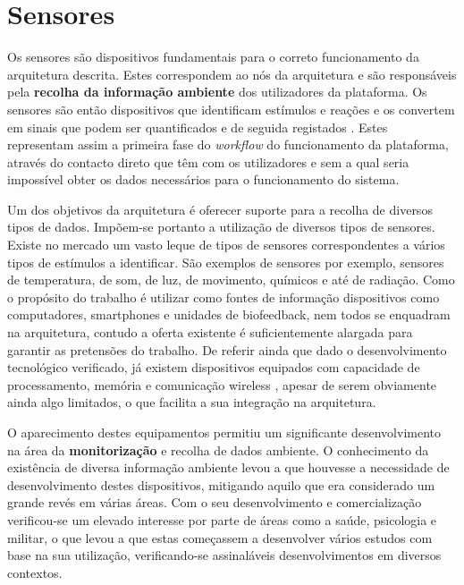 \section{Sensores}

Os sensores são dispositivos fundamentais para o correto funcionamento da arquitetura descrita. Estes correspondem ao nós da arquitetura e são responsáveis pela \textbf{recolha da informação ambiente} dos utilizadores da plataforma. Os sensores são então dispositivos que identificam estímulos e reações e os convertem em sinais que podem ser quantificados e de seguida registados \cite{akyildiz2002wireless}. Estes representam assim a primeira fase do \textit{workflow} do funcionamento da plataforma, através do contacto direto que têm com os utilizadores e sem a qual seria impossível obter os dados necessários para o funcionamento do sistema.

Um dos objetivos da arquitetura é oferecer suporte para a recolha de diversos tipos de dados. Impõem-se portanto a utilização de diversos tipos de sensores. Existe no mercado um vasto leque de tipos de sensores correspondentes a vários tipos de estímulos a identificar. São exemplos de sensores por exemplo, sensores de temperatura, de som, de luz, de movimento, químicos e até de radiação. Como o propósito do trabalho é utilizar como fontes de informação dispositivos como computadores, smartphones e unidades de biofeedback, nem todos se enquadram na arquitetura, contudo a oferta existente é suficientemente alargada para garantir as pretensões do trabalho. De referir ainda que dado o desenvolvimento tecnológico verificado, já existem dispositivos equipados com capacidade de processamento, memória e comunicação wireless \cite{akyildiz2002wireless}, apesar de serem obviamente ainda algo limitados, o que facilita a sua integração na arquitetura.

O aparecimento destes equipamentos permitiu um significante desenvolvimento na área da \textbf{monitorização} e recolha de dados ambiente\cite{himakashi2012wireless}. O conhecimento da existência de diversa informação ambiente levou a que houvesse a necessidade de desenvolvimento destes dispositivos, mitigando aquilo que era considerado um grande revés em várias áreas. Com o seu desenvolvimento e comercialização verificou-se um elevado interesse por parte de áreas como a saúde, psicologia e militar, o que levou a que estas começassem a desenvolver vários estudos com base na sua utilização, verificando-se assinaláveis desenvolvimentos em diversos contextos\cite{himakashi2012wireless}.


